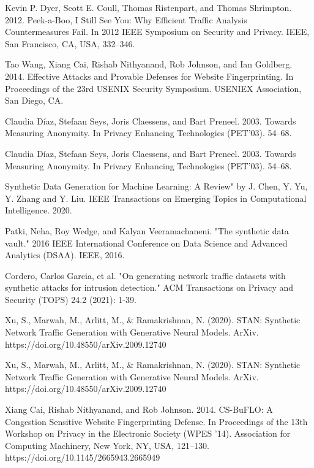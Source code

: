 \begin{thebibliography}{1}
Kevin P. Dyer, Scott E. Coull, Thomas Ristenpart, and Thomas Shrimpton. 2012. Peek-a-Boo, I Still See You: Why Efficient Traffic Analysis Countermeasures Fail. In 2012 IEEE Symposium on Security and Privacy. IEEE, San Francisco, CA, USA, 332–346.

Tao Wang, Xiang Cai, Rishab Nithyanand, Rob Johnson, and Ian Goldberg. 2014. Effective Attacks and Provable Defenses for Website Fingerprinting. In Proceedings of the 23rd USENIX Security Symposium. USENIEX Association, San Diego, CA.

Claudia Díaz, Stefaan Seys, Joris Claessens, and Bart Preneel. 2003. Towards Measuring Anonymity. In Privacy Enhancing Technologies (PET’03). 54–68.

Claudia Díaz, Stefaan Seys, Joris Claessens, and Bart Preneel. 2003. Towards Measuring Anonymity. In Privacy Enhancing Technologies (PET’03). 54–68.

Synthetic Data Generation for Machine Learning: A Review" by J. Chen, Y. Yu, Y. Zhang and Y. Liu. IEEE Transactions on Emerging Topics in Computational Intelligence. 2020.

Patki, Neha, Roy Wedge, and Kalyan Veeramachaneni. "The synthetic data vault." 2016 IEEE International Conference on Data Science and Advanced Analytics (DSAA). IEEE, 2016.


Cordero, Carlos Garcia, et al. "On generating network traffic datasets with synthetic attacks for intrusion detection." ACM Transactions on Privacy and Security (TOPS) 24.2 (2021): 1-39.

Xu, S., Marwah, M., Arlitt, M., \& Ramakrishnan, N. (2020). STAN: Synthetic Network Traffic Generation with Generative Neural Models. ArXiv. https://doi.org/10.48550/arXiv.2009.12740


Xu, S., Marwah, M., Arlitt, M., \& Ramakrishnan, N. (2020). STAN: Synthetic Network Traffic Generation with Generative Neural Models. ArXiv. https://doi.org/10.48550/arXiv.2009.12740

Xiang Cai, Rishab Nithyanand, and Rob Johnson. 2014. CS-BuFLO: A Congestion Sensitive Website Fingerprinting Defense. In Proceedings of the 13th Workshop on Privacy in the Electronic Society (WPES '14). Association for Computing Machinery, New York, NY, USA, 121–130. https://doi.org/10.1145/2665943.2665949


\end{thebibliography}
